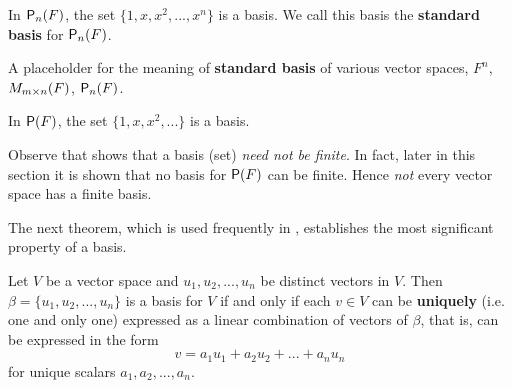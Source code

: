 \begin{example} \label{example 1.6.4}
In \(\textsf{P}_n(F)\), the set \(\{ 1, x, x^2, ..., x^n \}\) is a basis.
We call this basis the \textbf{standard basis} for \(\textsf{P}_n(F)\).
\end{example}

\begin{additional definition} \label{adef 1.11}
A placeholder for the meaning of \textbf{standard basis} of various vector spaces, \(F^n\), \(M_{m \times n}(F)\), \(\textsf{P}_n(F)\).
\end{additional definition}

\begin{example} \label{example 1.6.5}
In \(\textsf{P}(F)\), the set \(\{1, x, x^2, ... \}\) is a basis.
\end{example}

\begin{remark} \label{remark 1.6.1}
Observe that  shows that a basis (set) \emph{need not be finite}.
In fact, later in this section it is shown that no basis for \(\textsf{P}(F)\) can be finite.
Hence \emph{not} every vector space has a finite basis.
\end{remark}

The next theorem, which is used frequently in , establishes the most significant property of a basis.

\begin{theorem} \label{thm 1.8}
Let \(V\) be a vector space and \(u_1, u_2, ..., u_n\) be distinct vectors in \(V\).
Then \(\beta = \{ u_1, u_2, ..., u_n \}\) is a basis for \(V\) if and only if each \(v \in V\) can be \textbf{uniquely} (i.e. one and only one) expressed as a linear combination of vectors of \(\beta\), that is, can be expressed in the form
\[
    v = a_1 u_1 + a_2 u_2 + ... + a_n u_n
\]
for unique scalars \(a_1, a_2, ..., a_n\).
\end{theorem}

